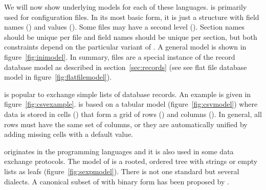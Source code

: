 We will now show underlying models for each of these languages.  
is primarily used for configuration files. In its most basic form, it is
just a  structure with field names () and 
values (). Some  files may have a second level 
(). Section names should be unique per file and field 
names should be unique per section, but both constraints depend on the
particular variant of . A general model is shown in 
figure~\ref{fig:inimodel}. In summary,  files are a special 
instance of the record database model as described in 
section~\ref{sec:records} (see see flat file database model in
figure~\ref{fig:flatfilemodel}).

 is popular to exchange simple lists of database records. 
An example is given in figure~\ref{fig:csvexample}. 
is based on a  tabular model (figure~\ref{fig:csvmodel}) where
data is stored in cells () that form a grid of rows
() and columns (). In general, all rows
must have the same set of columns, or they are automatically unified
by adding missing cells with a default value. 

 originates in the  programming languages and
it is also used in some data exchange protocols. The model of
 is a rooted, ordered tree with strings or empty lists
as leafs  (figure~\ref{fig:sexpmodel}). There is not one standard
but several dialects. A canonical subset of  with binary
form has been proposed by \textcite{Rivest1997}.

